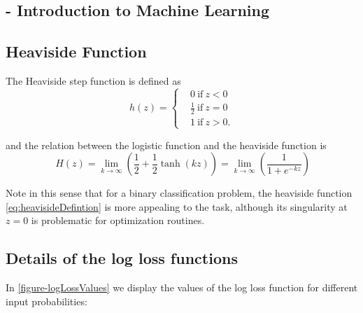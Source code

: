 \begin{appendices}

\chapter{- Introduction to Machine Learning}\label{appx:introMachineLearning}

\section{Heaviside Function}\label{appx:sec:heaviside}

The Heaviside step function is defined as
\begin{equation}\label{eq:heavisideDefintion}
h(z) =
\begin{cases}
&0 \ \mbox{if} \ z<0 \\
&\frac{1}{2} \ \mbox{if} \ z=0 \\
&1 \ \mbox{if} \ z>0.
\end{cases}
\end{equation}

and the relation between the logistic function and the heaviside function is
\begin{equation}
 \ H(z) = \lim_{k \to \infty} \left(\frac{1}{2} + \frac{1}{2}\tanh(kz) \right) = \lim_{k \to \infty} \left(\frac{1}{1+e^{-kz}} \right)
\end{equation}

Note in this sense that for a binary classification problem, the heaviside function \cref{eq:heavisideDefintion} is more appealing to the task, although its singularity at $z=0$ is problematic for optimization routines.

\section{Details of the log loss functions}\label{appx:sec:loglossDetails}

In \cref{figure-logLossValues} we display the values of the log loss function for different input probabilities:


\end{appendices}
